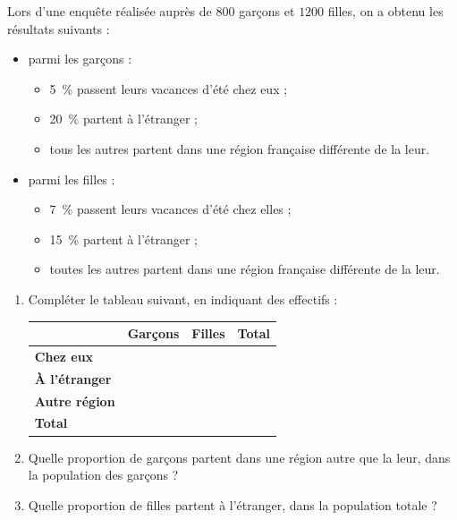 \exo

Lors d'une enquête réalisée auprès de $800$ garçons et $1200$ filles, on a obtenu les résultats suivants :
\begin{itemize}
\item parmi les garçons :
\begin{itemize}
\item \SI{5}{\percent} passent leurs vacances d'été chez eux ;
\item \SI{20}{\percent} partent à l'étranger ;
\item tous les autres partent dans une région française différente de la leur.
\end{itemize}
\item parmi les filles :
\begin{itemize}
\item \SI{7}{\percent} passent leurs vacances d'été chez elles ;
\item \SI{15}{\percent} partent à l'étranger ;
\item toutes les autres partent dans une région française différente de la leur.
\end{itemize}
\end{itemize}
\begin{enumerate}
\item Compléter le tableau suivant, en indiquant des effectifs :
\begin{center}
\setlength{\tabcolsep}{0.1cm}
\renewcommand{\arraystretch}{1.2}
\begin{tabular}{
|>{\raggedright\arraybackslash}m{3cm}
*{3}{|>{\centering\arraybackslash}m{3cm}}|}
\hline 
& \textbf{Garçons} & \textbf{Filles} & \textbf{Total} \\ 
\hline
\textbf{Chez eux} &  &  &  \\ 
\hline 
\textbf{À l'étranger} &  &  &  \\ 
\hline 
\textbf{Autre région} &  &  &  \\ 
\hline 
\textbf{Total} &  &  &  \\ 
\hline 
\end{tabular} 
\end{center}
\item Quelle proportion de garçons partent dans une région autre que la leur, dans la population des garçons ?
\item Quelle proportion de filles partent à l'étranger, dans la population totale ?
\end{enumerate}

\exo

